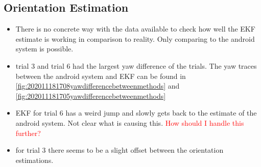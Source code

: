 \newpage


\subsection*{Orientation Estimation}

\begin{itemize}
	\item There is no concrete way with the data available to check how well the EKF estimate is working in comparison to reality. Only comparing to the android system is possible.
	\item trial 3 and trial 6 had the largest yaw difference of the trials. The yaw traces between the android system and EKF can be found in \cref{fig:202011181708yawdifferencebetweenmethods} and \cref{fig:202011181705yawdifferencebetweenmethods}
	\item EKF for trial 6 has a weird jump and slowly gets back to the estimate of the android system. Not clear what is causing this. \textcolor{red}{How should I handle this further?}
	\item for trial 3 there seems to be a slight offset between the orientation estimations.
\end{itemize}

